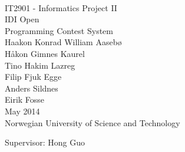 \thispagestyle{empty}

\mbox{}\\[6pc]
\begin{center}
\Huge{IT2901 - Informatics Project II}\\[2pc]
\huge{IDI Open}\\
\huge{Programming Contest System}\\[2pc]

\Large{Haakon Konrad William Aaseb{\o}}\\
\Large{H{\aa}kon Gimnes Kaurel}\\
\Large{Tino Hakim Lazreg}\\
\Large{Filip Fjuk Egge}\\
\Large{Anders Sildnes}\\
\Large{Eirik Fosse}\\[1pc]

\large{May 2014}\\[2pc]

Norwegian University of Science and Technology
\end{center}
\vfill

\noindent Supervisor: Hong Guo

